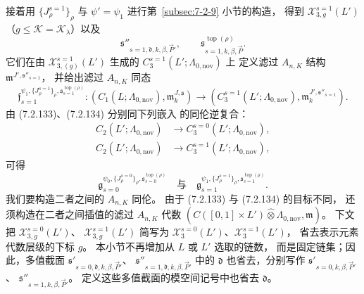 接着用 $\{J^{s=1}_\rho\}_\rho$ 与
$\psi'=\psi_1$ 进行第~\ref{subsec:7-2-9} 小节的构造，
得到 $\mathcal X^{s=1}_{3,g}(L')$
（$g\le\mathcal K=\mathcal K_\lambda$）以及
\[
\mathfrak s''_{s=1,\mathfrak d,k,\beta,\vec P'},
\qquad
\mathfrak s^{\operatorname{top}(\rho)}_{s=1,k,\beta,\vec P}.
\]
它们在由 $\mathcal X^{s=1}_{3,(g)}(L')$ 生成的
$C^{s=1}_3(L';\Lambda_{0,\mathrm{nov}})$ 上
定义滤过 $A_{n,K}$ 结构
$\mathfrak m^{J',\mathfrak s''_{s=1}}$，
并给出滤过 $A_{n,K}$ 同态
\begin{equation}
\mathfrak f_{s=1}^{\psi_1,\{J^{s=1}_\rho\}_\rho,
\mathfrak s^{\operatorname{top}(\rho)}_{s=1}}
\colon
(C_1(L;\Lambda_{0,\mathrm{nov}}),\mathfrak m^{J,\mathfrak s}_k)
\longrightarrow
(C^{s=1}_3(L';\Lambda_{0,\mathrm{nov}}),
\mathfrak m^{J',\mathfrak s''_{s=1}}_k).
\tag{7.2.134}\label{eq:7-2-134}
\end{equation}
由 (7.2.133)、(7.2.134) 分别同下列嵌入
的同伦逆复合：
\[
\begin{aligned}
C_2(L';\Lambda_{0,\mathrm{nov}})
&\longrightarrow C^{s=0}_3(L';\Lambda_{0,\mathrm{nov}}),\\
C_2(L';\Lambda_{0,\mathrm{nov}})
&\longrightarrow C^{s=1}_3(L';\Lambda_{0,\mathrm{nov}}),
\end{aligned}
\]
可得
\[
\mathfrak g_{s=0}^{\psi_0,\{J^{s=0}_\rho\}_\rho,
\mathfrak s^{\operatorname{top}(\rho)}_{s=0}}
\quad\text{与}\quad
\mathfrak g_{s=1}^{\psi_1,\{J^{s=1}_\rho\}_\rho,
\mathfrak s^{\operatorname{top}(\rho)}_{s=1}}.
\]
我们要构造二者之间的 $A_{n,K}$ 同伦。
由于 (7.2.133) 与 (7.2.134) 的目标不同，
还须构造在二者之间插值的滤过 $A_{n,K}$ 代数
$(C([0,1]\times L')\widehat\otimes
\Lambda_{0,\mathrm{nov}},\mathfrak m)$。
下文把 $\mathcal X^{s=0}_{3,g}(L')$、
$\mathcal X^{s=1}_{3,g}(L')$ 简写为
$\mathcal X^{s=0}_3(L')$、$\mathcal X^{s=1}_3(L')$，
省去表示元素代数层级的下标 $g$。
本小节不再增加从 $L$ 或 $L'$ 选取的链数，
而是固定链集；因此，多值截面
$\mathfrak s'_{s=0,\mathfrak d,k,\beta,\vec P'}$、
$\mathfrak s''_{s=1,\mathfrak d,k,\beta,\vec P'}$
中的 $\mathfrak d$ 也省去，分别写作
$\mathfrak s'_{s=0,k,\beta,\vec P'}$、
$\mathfrak s''_{s=1,k,\beta,\vec P'}$。
定义这些多值截面的模空间记号中也省去 $\mathfrak d$。

